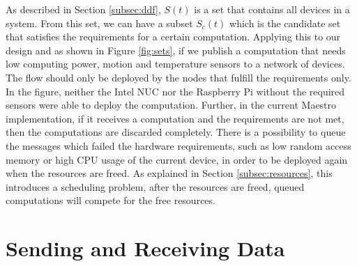 \noindent As described in Section \ref{subsec:ddf}, $S(t)$ is a set that contains all devices in a system. From this set, we can have a subset $S_c(t)$ which is the candidate set that satisfies the requirements for a certain computation.  Applying this to our design and as shown in Figure \ref{fig:sets}, if we publish a computation that needs low computing  power, motion and temperature sensors to a network of devices. The flow should only be deployed by the nodes that fulfill the requirements only. In the figure, neither the Intel NUC nor the Raspberry Pi without the required sensors were able to deploy the computation. Further, in the current Maestro implementation, if it receives a computation and  the requirements  are not met, then the computations are discarded completely. There is a possibility to queue the  messages which failed the hardware requirements, such as low random access memory or high CPU usage of the current device, in order to be deployed again when the resources are freed.  As explained in Section \ref{subsec:resources}, this introduces a scheduling problem, after the resources are freed, queued computations will compete for the free resources.







\section{Sending and Receiving Data}\label{subsec:send-receieve-data}

